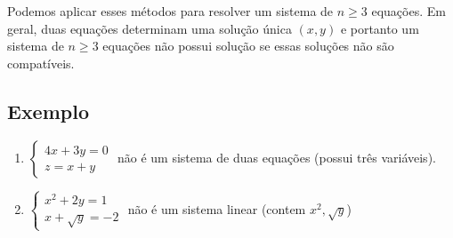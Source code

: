 Podemos aplicar esses métodos para resolver um sistema de $n \geq 3$ equações.
Em geral, duas equações determinam uma solução única $(x,y)$ e portanto um
sistema de $n \geq 3$ equações não possui solução se essas soluções não são
compatíveis.

\subsection*{Exemplo}

\begin{enumerate}
\item
$\left\{\begin{aligned}
  4x + 3y = 0 \\
  z = x + y
\end{aligned}\right.$ não é um sistema de duas equações (possui três variáveis).

\item
$\left\{\begin{aligned}
  x^2 + 2y = 1 \\
  x + \sqrt{y} = -2
\end{aligned}\right.$ não é um sistema linear (contem $x^2, \sqrt{y}$)


\end{enumerate}
